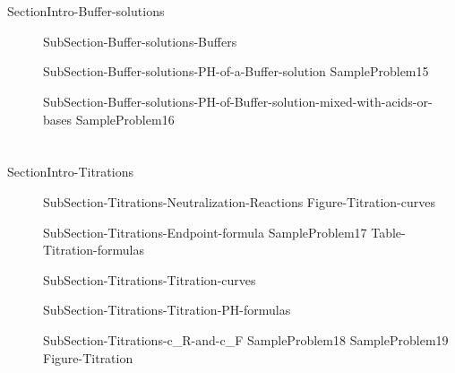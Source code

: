 \documentclass[main.tex]{subfiles}
\newcommand\chapterlabel{Ch-acidbase}\setcounter{figurenewcounter}{0}\setcounter{tablenewcounter}{0}\setcounter{formulanewcounter}{0}
\begin{document}
\section{\color{blue!30!black}{Buffer solutions}}{SectionIntro-Buffer-solutions}
\sloppy
\begin{description}
\item[] {SubSection-Buffer-solutions-Buffers}
\item[] {SubSection-Buffer-solutions-PH-of-a-Buffer-solution}
  {SampleProblem15}
\item[] {SubSection-Buffer-solutions-PH-of-Buffer-solution-mixed-with-acids-or-bases}
  {SampleProblem16}
\end{description}
\section{\color{blue!30!black}{Titrations}}{SectionIntro-Titrations}
\sloppy
\begin{description}
\item[] {SubSection-Titrations-Neutralization-Reactions}
  {Figure-Titration-curves}

\item[] {SubSection-Titrations-Endpoint-formula}
  {SampleProblem17}
     {Table-Titration-formulas}

\item[] {SubSection-Titrations-Titration-curves}
 
   
\item[] 
{SubSection-Titrations-Titration-PH-formulas}
\item[] 
{SubSection-Titrations-c_R-and-c_F}
   {SampleProblem18}
  {SampleProblem19}
  {Figure-Titration}
\end{description}
\end{document}
